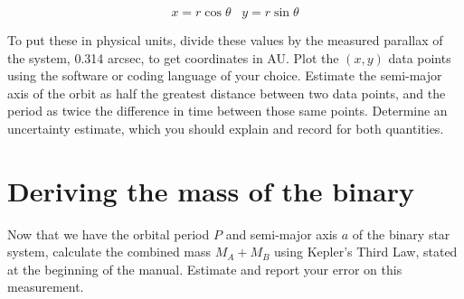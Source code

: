 \begin{equation}
x = r\cos\theta\;\;\;y = r\sin\theta
\end{equation}

To put these in physical units, divide these values by the measured parallax of the system, 0.314 arcsec, to get coordinates in AU. Plot the $(x,y)$ data points using the software or coding language of your choice.  Estimate the semi-major axis of the orbit as half the greatest distance between two data points, and the period as twice the difference in time between those same points. Determine an uncertainty estimate, which you should explain and record for both quantities.

\section{Deriving the mass of the binary}

Now that we have the orbital period $P$ and semi-major axis $a$ of the binary star system, calculate the combined mass $M_A + M_B$ using Kepler's Third Law, stated at the beginning of the manual. Estimate and report your error on this measurement. 


